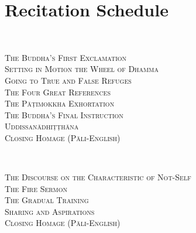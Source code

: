 \chapter{Recitation Schedule}
\label{schedule}

{\centering

  {\libertinusFont\selectfont\textbf{\textsc{}}}\\

  \textsc{
    The Buddha's First Exclamation \pageref{buddhas-first-exclamation}\\
    Setting in Motion the Wheel of Dhamma \pageref{wheel-of-dhamma-abridged}\\
    Going to True and False Refuges \pageref{true-false-refuges}\\
    The Four Great References \pageref{four-great-references}\\
    The Pāṭimokkha Exhortation \pageref{patimokkha-exhortation}\\
    The Buddha's Final Instruction \pageref{buddhas-final-instruction}\\
    Uddissanādhiṭṭhāna \pageref{uddissanadhitthana}\\
    Closing Homage (Pāli-English) \pageref{closing-homage}}


  {\libertinusFont\selectfont\textbf{\textsc{}}}\\


  \textsc{
    The Discourse on the Characteristic of Not-Self \pageref{characteristic-of-not-self}\\
    The Fire Sermon \pageref{fire-sermon}\\
    The Gradual Training \pageref{gradual-training}\\
    Sharing and Aspirations \pageref{sharing-aspirations}\\
    Closing Homage (Pāli-English) \pageref{closing-homage}}\\


  {\libertinusFont\selectfont\textbf{\textsc{}}}\\

}
